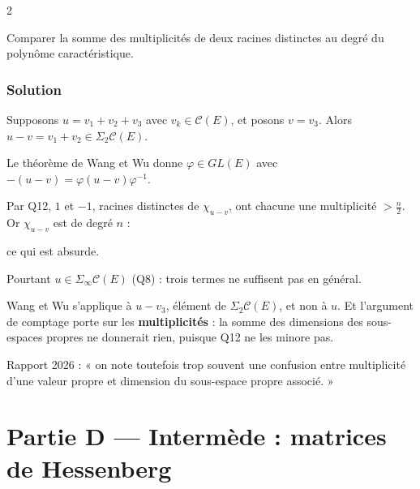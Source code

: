 \documentclass[11pt,a4paper]{article}
\newcommand{\equationajustee}[1]{%
  \sbox{\boiteequation}{$\displaystyle #1$}%
  \ifdim\wd\boiteequation>\linewidth
    \[\resizebox{\linewidth}{!}{\usebox{\boiteequation}}\]%
  \else
    \[#1\]%
  \fi}
\begin{document}
\begin{indication}{2}

Comparer la somme des multiplicités de deux racines distinctes au degré du polynôme caractéristique.

\end{indication}

\hypertarget{solution-12}{%
\subsubsection{Solution}\label{solution-12}}

Supposons \(u=v_1+v_2+v_3\) avec \(v_k\in\mathcal C(E)\), et posons \(v=v_3\). Alors \(u-v=v_1+v_2\in\Sigma_2\mathcal C(E)\).

Le théorème de Wang et Wu donne \(\varphi\in GL(E)\) avec \(-(u-v)=\varphi(u-v)\varphi^{-1}\).

Par Q12, \(1\) et \(-1\), racines distinctes de \(\chi_{u-v}\), ont chacune une multiplicité \(>\frac n2\). Or \(\chi_{u-v}\) est de degré \(n\) :

\equationajustee{n\geqslant\mu_1+\mu_{-1}>n,}

ce qui est absurde.

\equationajustee{\boxed{u\notin\Sigma_3\mathcal C(E).}}

Pourtant \(u\in\Sigma_\infty\mathcal C(E)\) (Q8) : trois termes ne suffisent pas en général.

\begin{piege}

Wang et Wu s'applique à \(u-v_3\), élément de \(\Sigma_2\mathcal C(E)\), et non à \(u\). Et l'argument de comptage porte sur les \textbf{multiplicités} : la somme des dimensions des sous-espaces propres ne donnerait rien, puisque Q12 ne les minore pas.

\end{piege}

\begin{jury}

Rapport 2026 : « on note toutefois trop souvent une confusion entre multiplicité d'une valeur propre et dimension du sous-espace propre associé. »

\end{jury}

\hypertarget{partie-d-intermuxe8de-matrices-de-hessenberg}{%
\section{Partie D --- Intermède : matrices de Hessenberg}\label{partie-d-intermuxe8de-matrices-de-hessenberg}}
\end{document}
